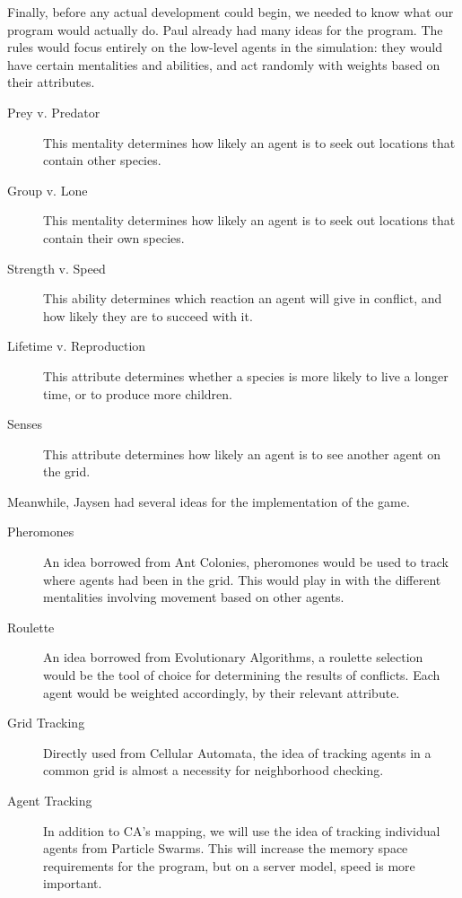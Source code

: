 Finally, before any actual development could begin, we needed to know what our
program would actually do. Paul already had many ideas for the program. The rules
would focus entirely on the low-level agents in the simulation: they would have
certain mentalities and abilities, and act randomly with weights based on their
attributes.
\begin{description}
    \item[Prey v. Predator] This mentality determines how likely an agent is to
        seek out locations that contain other species.
    \item[Group v. Lone] This mentality determines how likely an agent is to seek
        out locations that contain their own species.
    \item[Strength v. Speed] This ability determines which reaction an agent will
        give in conflict, and how likely they are to succeed with it.
    \item[Lifetime v. Reproduction] This attribute determines whether a species is
        more likely to live a longer time, or to produce more children.
    \item[Senses] This attribute determines how likely an agent is to see another
        agent on the grid.
\end{description}
Meanwhile, Jaysen had several ideas for the implementation of the game.
\begin{description}
    \item[Pheromones] An idea borrowed from Ant Colonies, pheromones would be used
        to track where agents had been in the grid. This would play in with the
        different mentalities involving movement based on other agents.
    \item[Roulette] An idea borrowed from Evolutionary Algorithms, a roulette
        selection would be the tool of choice for determining the results of
        conflicts. Each agent would be weighted accordingly, by their relevant
        attribute.
    \item[Grid Tracking] Directly used from Cellular Automata, the idea of tracking
        agents in a common grid is almost a necessity for neighborhood checking.
    \item[Agent Tracking] In addition to CA's mapping, we will use the idea of
        tracking individual agents from Particle Swarms. This will increase the
        memory space requirements for the program, but on a server model, speed is
        more important.
\end{description}

